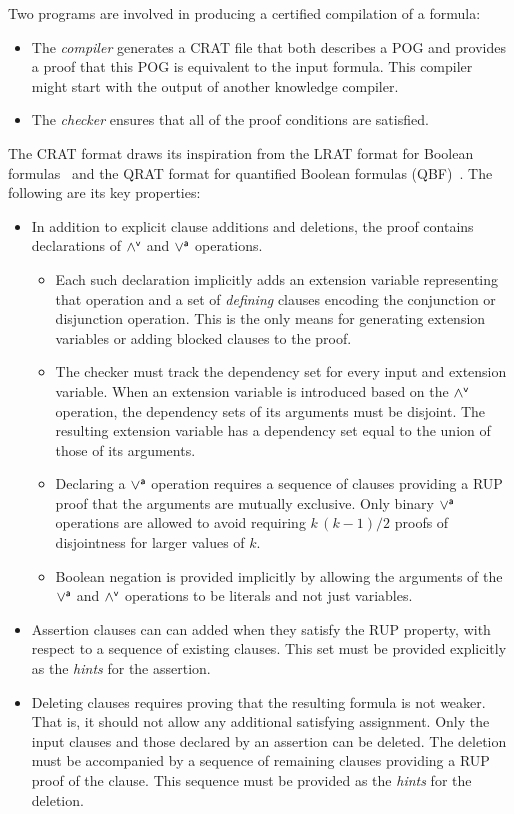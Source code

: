 \documentclass[letterpaper,USenglish,cleveref, autoref, thm-restate]{lipics-v2021}
\newcommand{\pand}{\mathbin{\land^{\sf v}}}
\newcommand{\por}{\mathbin{\lor^{\sf a}}}
\begin{document}
Two programs are involved in producing a certified compilation of a formula:
\begin{itemize}
\item The {\em compiler} generates a CRAT file that both describes a POG and provides a proof that this POG is equivalent to the input formula.
  This compiler might start with the output of another knowledge compiler.
\item The {\em checker} ensures that all of the proof conditions are satisfied.  
\end{itemize}

The CRAT format draws its inspiration from the LRAT format for Boolean
formulas~\cite{lrat} and the QRAT format for quantified Boolean
formulas (QBF)~\cite{heule:JAR2014}.  The following are its key properties:
\begin{itemize}
  \item
  In addition to explicit clause additions and deletions, the proof contains declarations of $\pand$ and $\por$ operations.
\begin{itemize}
\item 
  Each such declaration implicitly adds an extension variable representing that operation and a set of {\em defining} clauses
  encoding the conjunction or disjunction operation.
  This is the only means for generating extension variables or adding blocked clauses to the proof.
\item The checker must track the dependency set for every input and
  extension variable.  When an extension variable is introduced based
  on the $\pand$ operation, the dependency sets of its arguments must
  be disjoint.  The resulting extension variable has a dependency set equal to the union of those of its arguments.
\item Declaring a $\por$ operation requires a sequence of clauses
  providing a RUP proof that the arguments are mutually exclusive.
  Only binary $\por$ operations are allowed to avoid requiring
  $k\,(k-1)/2$ proofs of disjointness for larger values of $k$.
\item Boolean negation is provided implicitly by allowing the
  arguments of the $\por$ and $\pand$ operations to be literals and not just
  variables.
\end{itemize}
\item
  Assertion clauses can can added when they satisfy the RUP
  property, with respect to a sequence of existing clauses.  This set must be provided explicitly as the {\em hints} for the assertion.
\item
  Deleting clauses requires proving that the resulting formula is not weaker.
  That is, it should not allow any additional satisfying assignment.
  Only the input clauses and those declared by an assertion can be deleted.
      The deletion must be accompanied by a sequence of remaining clauses
      providing a RUP proof of the clause.  This sequence must be provided as the {\em hints} for the deletion.
\end{itemize}
\end{document}
